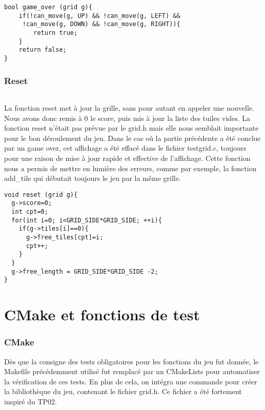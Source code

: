 \documentclass{report}
\begin{document}
\begin{lstlisting}
bool game_over (grid g){
	if(!can_move(g, UP) && !can_move(g, LEFT) &&
	 !can_move(g, DOWN) && !can_move(g, RIGHT)){
		return true;
	}
	return false;
}
\end{lstlisting}


\section{Reset}

\paragraph{}La fonction reset met à jour la grille, sans pour autant en appeler une nouvelle. Nous avons donc remis à 0 le score, puis mis à jour la liste des tuiles vides. La fonction reset n'était pas prévue par le grid.h mais elle nous semblait importante pour le bon déroulement du jeu.
Dans le cas où la partie précédente a été conclue par un game over, cet affichage a été effacé dans le fichier testgrid.c, toujours pour une raison de mise à jour rapide et effective de l'affichage.
Cette fonction nous a permis de mettre en lumière des erreurs, comme par exemple, la fonction add{\_}tile qui débutait toujours le jeu par la même grille.

\begin{lstlisting}
void reset (grid g){
  g->score=0;
  int cpt=0;
  for(int i=0; i<GRID_SIDE*GRID_SIDE; ++i){
    if(g->tiles[i]==0){
      g->free_tiles[cpt]=i;
      cpt++;
    }
  }
  g->free_length = GRID_SIDE*GRID_SIDE -2;
}
\end{lstlisting}


\part{CMake et fonctions de test}

\section*{CMake}
Dès que la consigne des tests obligatoires pour les fonctions du jeu fut donnée, le Makefile précédemment utilisé fut remplacé par un CMakeLists pour automatiser la vérification de ces tests. En plus de cela, on intégra une commande pour créer la bibliothèque du jeu, contenant le fichier grid.h. Ce fichier a été fortement inspiré du TP02.
\end{document}
